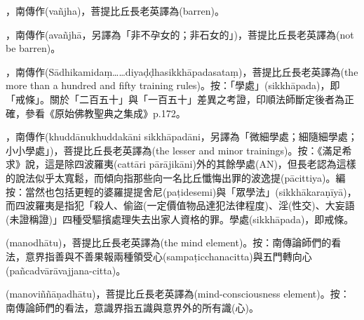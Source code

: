 \startitemgroup[noteitems]
\item{}，南傳作(vañjha)，菩提比丘長老英譯為(barren)。
\item{}，南傳作(avañjhā，另譯為「非不孕女的；非石女的」)，菩提比丘長老英譯為(not be barren)。
\stopitemgroup

\startitemgroup[noteitems]
\item{}，南傳作(Sādhikamidaṃ……diyaḍḍhasikkhāpadasataṃ)，菩提比丘長老英譯為(the more than a hundred and fifty training rules)。按：「學處」(sikkhāpada)，即「戒條」。關於「二百五十」與「一百五十」差異之考證，印順法師斷定後者為正確，參看《原始佛教聖典之集成》p.172。
\stopitemgroup

\startitemgroup[noteitems]
\item{}，南傳作(khuddānukhuddakāni sikkhāpadāni，另譯為「微細學處；細隨細學處；小小學處」)，菩提比丘長老英譯為(the lesser and minor trainings)。按：《滿足希求》說，這是除四波羅夷(cattāri pārājikāni)外的其餘學處(AN)，但長老認為這樣的說法似乎太寬鬆，而傾向指那些向一名比丘懺悔出罪的波逸提(pācittiya)。編按：當然也包括更輕的婆羅提提舍尼(paṭidesemi)與「眾學法」(sikkhākaraṇīyā)，而四波羅夷是指犯「殺人、偷盜(一定價值物品達犯法律程度)、淫(性交)、大妄語(未證稱證)」四種受驅擯處理失去出家人資格的罪。學處(sikkhāpada)，即戒條。
\stopitemgroup

\startitemgroup[noteitems]
\item{}(manodhātu)，菩提比丘長老英譯為(the mind element)。按：南傳論師們的看法，意界指善與不善果報兩種領受心(sampaṭicchanacitta)與五門轉向心(pañcadvārāvajjana-citta)。
\item{}(manoviññāṇadhātu)，菩提比丘長老英譯為(mind-consciousness element)。按：南傳論師們的看法，意識界指五識與意界外的所有識(心)。
\stopitemgroup

